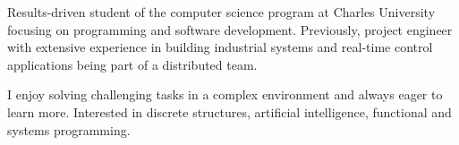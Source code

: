 Results-driven student of the computer science program at Charles University focusing on programming and software development. Previously, project engineer with extensive experience in building industrial systems and real-time control applications being part of a distributed team.

I enjoy solving challenging tasks in a complex environment and always eager to learn more. Interested in discrete structures, artificial intelligence, functional and systems programming.
